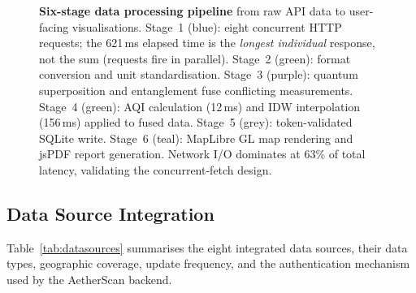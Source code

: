 \documentclass[12pt,a4paper]{article}
\begin{document}
\begin{figure}[H]
\caption[Six-stage data processing pipeline]{%
  \textbf{Six-stage data processing pipeline} from raw API data to
  user-facing visualisations. Stage~1 (blue): eight concurrent HTTP
  requests; the 621\,ms elapsed time is the \emph{longest individual}
  response, not the sum (requests fire in parallel). Stage~2 (green):
  format conversion and unit standardisation. Stage~3 (purple): quantum
  superposition and entanglement fuse conflicting measurements.
  Stage~4 (green): AQI calculation (12\,ms) and IDW interpolation (156\,ms)
  applied to fused data. Stage~5 (grey): token-validated SQLite write.
  Stage~6 (teal): MapLibre GL map rendering and jsPDF report generation.
  Network I/O dominates at 63\% of total latency, validating the
  concurrent-fetch design.}
\label{fig:dataflow}
\end{figure}

\subsection{Data Source Integration}
\label{sec:sysdesign:sources}

Table~\ref{tab:datasources} summarises the eight integrated data sources,
their data types, geographic coverage, update frequency, and the authentication
mechanism used by the AetherScan backend.
\end{document}
